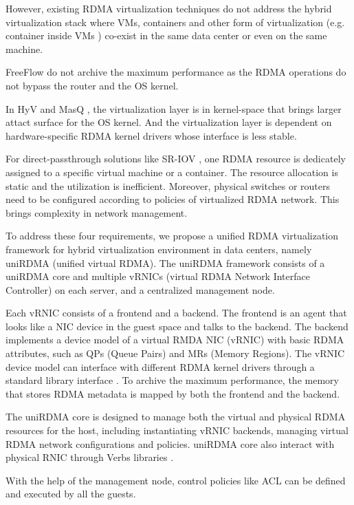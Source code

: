 However, existing RDMA virtualization techniques do not address the hybrid virtualization stack where VMs, containers and other form of virtualization (e.g. container inside VMs \cite{containeronvm}) co-exist in the same data center or even on the same machine.

FreeFlow \cite{kim2019freeflow} do not archive the maximum performance as the RDMA operations do not bypass the router and the OS kernel.

In HyV \cite{pfefferle2015hybrid} and MasQ \cite{he2020masq}, the virtualization layer is in kernel-space that brings larger attact surface for the OS kernel. And the virtualization layer is dependent on hardware-specific RDMA kernel drivers whose interface is less stable.

For direct-passthrough solutions like SR-IOV \cite{sr-iov}, one RDMA resource is dedicately assigned to a specific virtual machine or a container. The resource allocation is static and the utilization is inefficient. Moreover, physical switches or routers need to be configured according to policies of virtualized RDMA network. This brings complexity in network management.

To address these four requirements, we propose a unified RDMA virtualization framework for hybrid virtualization environment in data centers, namely uniRDMA (unified virtual RDMA). The uniRDMA framework consists of a uniRDMA core and multiple vRNICs (virtual RDMA Network Interface Controller) on each server, and a centralized management node.

Each vRNIC consists of a frontend and a backend. The frontend is an agent that looks like a NIC device in the guest space and talks to the backend. The backend implements a device model of a virtual RMDA NIC (vRNIC) with basic RDMA attributes, such as QPs (Queue Pairs) and MRs (Memory Regions). The vRNIC device model can interface with different RDMA kernel drivers through a standard library interface \cite{verbs}. To archive the maximum performance, the memory that stores RDMA metadata is mapped by both the frontend and the backend. 

The uniRDMA core is designed to manage both the virtual and physical RDMA resources for the host, including instantiating vRNIC backends, managing virtual RDMA network configurations and policies. uniRDMA core also interact with physical RNIC through Verbs libraries \cite{verbs}.

With the help of the management node, control policies like ACL can be defined and executed by all the guests.

